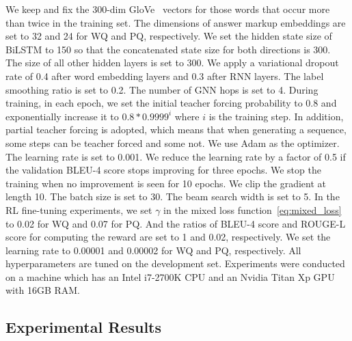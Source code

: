 \documentclass[journal]{IEEEtran}
\begin{document}
We keep and fix the 300-dim GloVe~\cite{pennington2014glove} vectors for those words that occur more than twice in the training set.
The dimensions of answer markup embeddings are set to 32 and 24 for WQ and PQ, respectively.
We set the hidden state size of BiLSTM to 150 so that the concatenated state size for both directions is 300.
The size of all other hidden layers is set to 300.
We apply a variational dropout~\cite{kingma2015variational} rate of 0.4 after word embedding layers and 0.3 after RNN layers.
The label smoothing ratio is set to 0.2.
The number of GNN hops is set to 4.
During training, 
in each epoch, we set the initial teacher forcing probability to 0.8 and exponentially increase it to $0.8 * 0.9999^i$ where $i$ is the training step.
In addition, partial teacher forcing is adopted, which means that
when generating a sequence, some steps can be teacher forced and some not.
We use Adam \cite{kingma2014adam} as the optimizer.
The learning rate is set to 0.001.
We reduce the learning rate by a factor of 0.5 if the validation BLEU-4 score stops improving for three epochs. 
We stop the training when no improvement is seen for 10 epochs.
We clip the gradient at length 10.
The batch size is set to 30.
The beam search width is set to 5.
In the RL fine-tuning experiments, 
we set $\gamma$ in the mixed loss function~\cref{eq:mixed_loss} to 0.02 for WQ and 0.07 for PQ.
And the ratios of BLEU-4 score and ROUGE-L score for computing the reward are set to 1 and 0.02, respectively.
We set the learning rate to 0.00001 and 0.00002 for WQ and PQ, respectively.
All hyperparameters are tuned on the development set.
Experiments were conducted on a machine which has an Intel i7-2700K CPU and an Nvidia Titan Xp GPU with 16GB RAM.


\subsection{Experimental Results}
\end{document}
